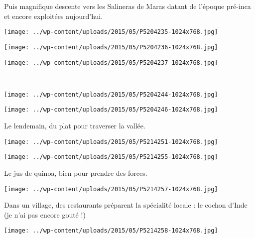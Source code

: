 Puis magnifique descente vers les Salineras de Maras datant de l'époque pré-inca et encore exploitées aujourd'hui. 
\begin{center} \texttt{[image: ../wp-content/uploads/2015/05/P5204235-1024x768.jpg]} \end{center}
\begin{center} \texttt{[image: ../wp-content/uploads/2015/05/P5204236-1024x768.jpg]} \end{center}
\vfill
\begin{center} \texttt{[image: ../wp-content/uploads/2015/05/P5204237-1024x768.jpg]} \end{center}
\vspace{-\topsep}
\vspace{-0.75mm}
\pagebreak
~
\begin{center} \texttt{[image: ../wp-content/uploads/2015/05/P5204244-1024x768.jpg]} \end{center}
\begin{center} \texttt{[image: ../wp-content/uploads/2015/05/P5204246-1024x768.jpg]} \end{center}
\vspace{-\topsep}
\vspace{-3.25mm}
\pagebreak

Le lendemain, du plat pour traverser la vallée. 
\begin{center} \texttt{[image: ../wp-content/uploads/2015/05/P5214251-1024x768.jpg]} \end{center}
\begin{center} \texttt{[image: ../wp-content/uploads/2015/05/P5214255-1024x768.jpg]} \end{center}
\vspace{-\topsep}
\vspace{-3.25mm}
\pagebreak

Le jus de quinoa, bien pour prendre des forces. 
\begin{center} \texttt{[image: ../wp-content/uploads/2015/05/P5214257-1024x768.jpg]} \end{center}

Dans un village, des restaurants préparent la spécialité locale : le cochon d'Inde (je n'ai pas encore gouté !)
\begin{center} \texttt{[image: ../wp-content/uploads/2015/05/P5214258-1024x768.jpg]} \end{center}
\vspace{-\topsep}
\pagebreak

